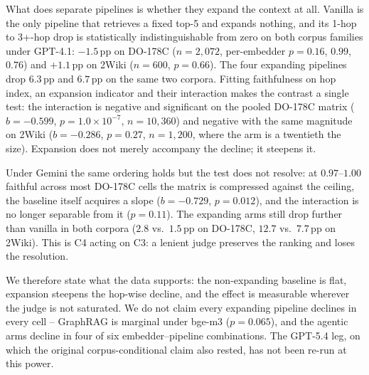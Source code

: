 What does separate pipelines is whether they expand the context at all.
Vanilla is the only pipeline that retrieves a fixed top-5 and expands
nothing, and its 1-hop to 3+-hop drop is statistically indistinguishable
from zero on both corpus families under GPT-4.1: ${-}1.5$\,pp on DO-178C
($n{=}2{,}072$, per-embedder $p{=}0.16$, $0.99$, $0.76$) and $+1.1$\,pp
on 2Wiki ($n{=}600$, $p{=}0.66$). The four expanding pipelines drop
$6.3$\,pp and $6.7$\,pp on the same two corpora. Fitting faithfulness on
hop index, an expansion indicator and their interaction makes the
contrast a single test: the interaction is negative and significant on
the pooled DO-178C matrix ($b{=}{-}0.599$, $p{=}1.0{\times}10^{-7}$,
$n{=}10{,}360$) and negative with the same magnitude on 2Wiki
($b{=}{-}0.286$, $p{=}0.27$, $n{=}1{,}200$, where the arm is a
twentieth the size). Expansion does not merely accompany the decline; it
steepens it.

Under Gemini the same ordering holds but the test does not resolve: at
$0.97$--$1.00$ faithful across most DO-178C cells the matrix is
compressed against the ceiling, the baseline itself acquires a slope
($b{=}{-}0.729$, $p{=}0.012$), and the interaction is no longer separable
from it ($p{=}0.11$). The expanding arms still drop further than vanilla
in both corpora ($2.8$ vs.\ $1.5$\,pp on DO-178C, $12.7$ vs.\ $7.7$\,pp
on 2Wiki). This is C4 acting on C3: a lenient judge preserves the
ranking and loses the resolution.

We therefore state what the data supports: the non-expanding baseline is
flat, expansion steepens the hop-wise decline, and the effect is
measurable wherever the judge is not saturated. We do not claim every
expanding pipeline declines in every cell -- GraphRAG is marginal under
bge-m3 ($p{=}0.065$), and the agentic arms decline in four of six
embedder--pipeline combinations. The GPT-5.4 leg, on which the original
corpus-conditional claim also rested, has not been re-run at this power.


